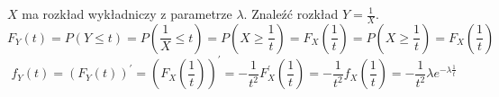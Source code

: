 \begin{zad}
$X$ ma rozkład wykładniczy z parametrze $\lambda$. Znaleźć rozkład $Y = \frac{1}{X}$.
$$
F_Y(t)=P(Y \le t)=P(\frac{1}{X} \le t)=P(X \ge \frac{1}{t})=F_X(\frac{1}{t})=P(X \ge \frac{1}{t})=F_X(\frac{1}{t})
$$
$$
f_Y(t)=(F_Y(t))^{'}=(F_X(\frac{1}{t}))^{'}=-\frac{1}{t^2}F^{'}_X(\frac{1}{t})=-\frac{1}{t^2}f_X(\frac{1}{t})=-\frac{1}{t^2}\lambda e^{-\lambda \frac{1}{t}}
$$
\end{zad}
